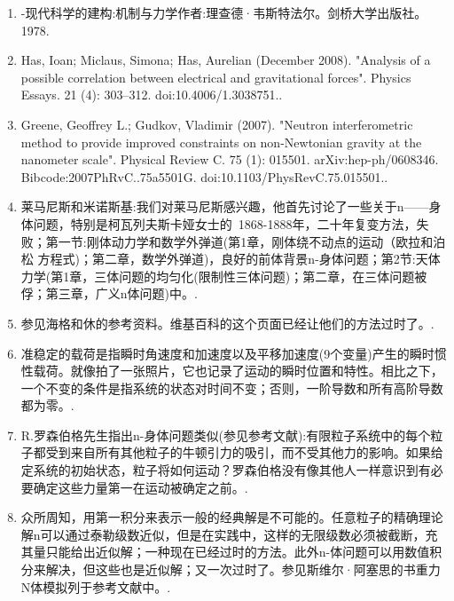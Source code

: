 \begin{enumerate}
\item -现代科学的建构:机制与力学作者:理查德·韦斯特法尔。剑桥大学出版社。1978.
\item Has, Ioan; Miclaus, Simona; Has, Aurelian (December 2008). "Analysis of a possible correlation between electrical and gravitational forces". Physics Essays. 21 (4): 303–312. doi:10.4006/1.3038751..
\item Greene, Geoffrey L.; Gudkov, Vladimir (2007). "Neutron interferometric method to provide improved constraints on non-Newtonian gravity at the nanometer scale". Physical Review C. 75 (1): 015501. arXiv:hep-ph/0608346. Bibcode:2007PhRvC..75a5501G. doi:10.1103/PhysRevC.75.015501..
\item 莱马尼斯和米诺斯基:我们对莱马尼斯感兴趣，他首先讨论了一些关于n——身体问题，特别是柯瓦列夫斯卡娅女士的~1868-1888年，二十年复变方法，失败；第一节:刚体动力学和数学外弹道(第1章，刚体绕不动点的运动（欧拉和泊松 方程式)；第二章，数学外弹道)，良好的前体背景n-身体问题；第2节:天体力学(第1章，三体问题的均匀化(限制性三体问题)；第二章，在三体问题被俘；第三章，广义n体问题)中。.
\item 参见海格和休的参考资料。维基百科的这个页面已经让他们的方法过时了。.
\item 准稳定的载荷是指瞬时角速度和加速度以及平移加速度(9个变量)产生的瞬时惯性载荷。就像拍了一张照片，它也记录了运动的瞬时位置和特性。相比之下，一个不变的条件是指系统的状态对时间不变；否则，一阶导数和所有高阶导数都为零。.
\item R.罗森伯格先生指出n-身体问题类似(参见参考文献):有限粒子系统中的每个粒子都受到来自所有其他粒子的牛顿引力的吸引，而不受其他力的影响。如果给定系统的初始状态，粒子将如何运动？罗森伯格没有像其他人一样意识到有必要确定这些力量第一在运动被确定之前。.
\item 众所周知，用第一积分来表示一般的经典解是不可能的。任意粒子的精确理论解n可以通过泰勒级数近似，但是在实践中，这样的无限级数必须被截断，充其量只能给出近似解；一种现在已经过时的方法。此外n-体问题可以用数值积分来解决，但这些也是近似解；又一次过时了。参见斯维尔·阿塞思的书重力N体模拟列于参考文献中。.
\end{enumerate}

